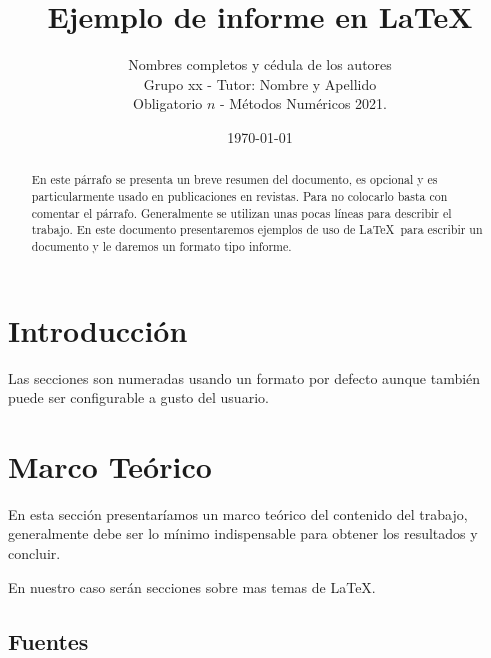 \documentclass[a4paper,11pt]{article}
\title{Ejemplo de informe en \LaTeX}
\author{%
  Nombres completos y cédula de los autores\\ %
  Grupo xx - Tutor: Nombre y Apellido \\ %
  Obligatorio $n$ - Métodos Numéricos 2021.}
\date{\today} %
\begin{document}
	
\renewcommand{\tablename}{\bfseries Tabla} %
\renewcommand{\figurename}{\bfseries Figura} %
%
\maketitle


\begin{abstract}
En este párrafo se presenta un breve resumen del documento, es opcional y es particularmente usado en publicaciones en revistas. Para no colocarlo basta con comentar el párrafo. %
Generalmente se utilizan unas pocas líneas para describir el trabajo. %
En este documento presentaremos ejemplos de uso de \LaTeX~para escribir un documento y le daremos un formato tipo informe.
\end{abstract}

\tableofcontents

\newpage


\section{Introducción}
%
Las secciones son numeradas usando un formato por defecto aunque también puede ser configurable a gusto del usuario.

\section{Marco Teórico}
%
En esta sección presentaríamos un marco teórico del contenido del trabajo, generalmente debe ser lo mínimo indispensable para obtener los resultados y concluir.

En nuestro caso serán secciones sobre mas temas de \LaTeX.

\subsection{Fuentes}
\end{document}
